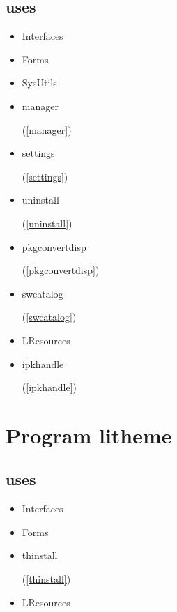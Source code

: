 \documentclass{report}
\begin{document}
\section{uses}
\begin{itemize}
\item \begin{ttfamily}Interfaces\end{ttfamily}\item \begin{ttfamily}Forms\end{ttfamily}\item \begin{ttfamily}SysUtils\end{ttfamily}\item \begin{ttfamily}manager\end{ttfamily}(\ref{manager})\item \begin{ttfamily}settings\end{ttfamily}(\ref{settings})\item \begin{ttfamily}uninstall\end{ttfamily}(\ref{uninstall})\item \begin{ttfamily}pkgconvertdisp\end{ttfamily}(\ref{pkgconvertdisp})\item \begin{ttfamily}swcatalog\end{ttfamily}(\ref{swcatalog})\item \begin{ttfamily}LResources\end{ttfamily}\item \begin{ttfamily}ipkhandle\end{ttfamily}(\ref{ipkhandle})\end{itemize}
\chapter{Program litheme}
\label{litheme}
\section{uses}
\begin{itemize}
\item \begin{ttfamily}Interfaces\end{ttfamily}\item \begin{ttfamily}Forms\end{ttfamily}\item \begin{ttfamily}thinstall\end{ttfamily}(\ref{thinstall})\item \begin{ttfamily}LResources\end{ttfamily}\end{itemize}
\end{document}
